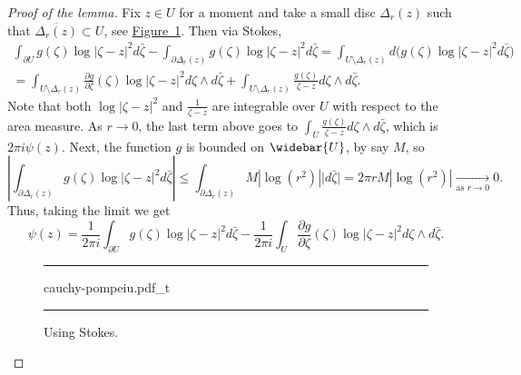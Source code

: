 \documentclass[12pt,openany]{book}
\newcommand{\sabs}[1]{\lvert {#1} \rvert}
\newcommand{\abs}[1]{\left\lvert {#1} \right\rvert}
\theoremstyle{plain}
\theoremstyle{remark}
\theoremstyle{definition}
\newenvironment{myfig}{%
\begin{figure}[h!t]
\noindent\rule{\textwidth}{0.5pt}\vspace{12pt}\par\centering}%
{\par\noindent\rule{\textwidth}{0.5pt}
\end{figure}}
\theoremstyle{exercise}
\theoremstyle{example}
\newcommand{\figureref}[1]{\hyperref[#1]{Figure~\ref*{#1}}}
\begin{document}
\begin{proof}[Proof of the lemma]
Fix $z \in U$ for a moment and take a small disc $\Delta_r(z)$ such that
$\overline{\Delta_r(z)} \subset U$, see \figureref{fig:usingstokes}.  Then via Stokes,
\begin{multline*}
\int_{\partial U}
g(\zeta) \log \sabs{\zeta-z}^2 d \bar{\zeta}
-
\int_{\partial \Delta_r(z)}
g(\zeta) \log \sabs{\zeta-z}^2 d \bar{\zeta}
=
\int_{U \setminus \Delta_r(z)}
d\bigl( g(\zeta) \log \sabs{\zeta-z}^2 d \bar{\zeta} \bigr)
\\
=
\int_{U \setminus \Delta_r(z)}
\frac{\partial g}{\partial \zeta}(\zeta)
\log \sabs{\zeta-z}^2
d \zeta \wedge d \bar{\zeta}
+
\int_{U \setminus \Delta_r(z)}
\frac{g(\zeta)}{\zeta-z}
d \zeta \wedge d \bar{\zeta} .
\end{multline*}
Note that both $\log \sabs{\zeta-z}^2$ and $\frac{1}{\zeta-z}$ are integrable
over $U$ with respect to the area measure.
As $r \to 0$, the last term above goes to $\int_U \frac{g(\zeta)}{\zeta-z}
d\zeta \wedge d\bar{\zeta}$, which is $2\pi i \psi(z)$.
Next, the function $g$ is bounded on $\widebar{U}$, by say $M$, so
\begin{equation*}
\abs{
\int_{\partial \Delta_r(z)}
g(\zeta) \log \sabs{\zeta-z}^2 d \bar{\zeta}
}
\leq
\int_{\partial \Delta_r(z)}
M
\abs{\log (r^2)} \sabs{d \bar{\zeta}}
=
2\pi r M \abs{\log(r^2)}
\underset{\text{as } r \to 0}{\to} 0 .
\end{equation*}
Thus, taking the limit we get
\begin{equation*}
\psi(z)
=
\frac{1}{2\pi i}
\int_{\partial U}
g(\zeta) \log \sabs{\zeta-z}^2 d \bar{\zeta}
-
\frac{1}{2\pi i}
\int_{U}
\frac{\partial g}{\partial \zeta}(\zeta)
\log \sabs{\zeta-z}^2
d \zeta \wedge d \bar{\zeta} .
\end{equation*}
\begin{myfig}
{cauchy-pompeiu.pdf_t}
\caption{Using Stokes.\label{fig:usingstokes}}
\end{myfig}


\end{proof}
\end{document}
